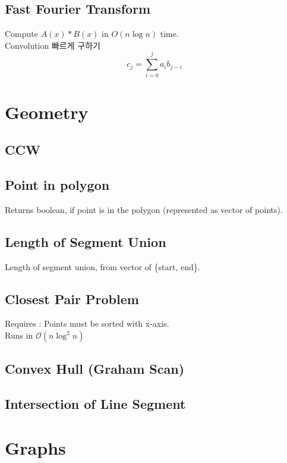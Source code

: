 \documentclass[landscape,8pt]{article}
\begin{document}
\begin{multicols}{2}
  \subsection{Fast Fourier Transform}
    Compute $A(x) * B(x)$ in $O(n\log n)$ time.\\
    Convolution 빠르게 구하기 \[ c_j = \sum_{i = 0}^{j} a_i b_{j-i}\]
    
  \columnbreak
\section{Geometry}
  \subsection{CCW}
    

  \subsection{Point in polygon}
    Returns boolean, if point is in the polygon (represented as vector of points).
    
  \subsection{Length of Segment Union}
    Length of segment union, from vector of \{start, end\}.
    
  \subsection{Closest Pair Problem}
    Requires : Points must be sorted with x-axis.\\
    Runs in $\mathcal{O}(n \log^2 n)$
    
  \subsection{Convex Hull (Graham Scan)}
    
  \subsection{Intersection of Line Segment}
    
\columnbreak

\section{Graphs}

\end{multicols}
\end{document}
